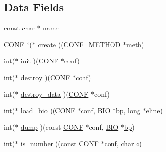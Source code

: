 \subsection*{Data Fields}
\begin{DoxyCompactItemize}
\item 
const char $\ast$ \hyperlink{structconf__method__st_afcd1706c9144e6d6eee6127661ae3be2}{name}
\item 
\hyperlink{crypto_2ossl__typ_8h_a22bfdc2f19c31f1ec7bd6d807aeb68d2}{C\+O\+NF} $\ast$($\ast$ \hyperlink{structconf__method__st_a5b75aba720dbe63825206c993d97607d}{create} )(\hyperlink{crypto_2conf_2conf_8h_a8e1c42b09eb2fde768c3a90e8338a6ea}{C\+O\+N\+F\+\_\+\+M\+E\+T\+H\+OD} $\ast$meth)
\item 
int($\ast$ \hyperlink{structconf__method__st_aa0e0f4791abf370d6be68caba8aa10e5}{init} )(\hyperlink{crypto_2ossl__typ_8h_a22bfdc2f19c31f1ec7bd6d807aeb68d2}{C\+O\+NF} $\ast$conf)
\item 
int($\ast$ \hyperlink{structconf__method__st_ac5ae49e4cf00c4babd1ca0856eae887f}{destroy} )(\hyperlink{crypto_2ossl__typ_8h_a22bfdc2f19c31f1ec7bd6d807aeb68d2}{C\+O\+NF} $\ast$conf)
\item 
int($\ast$ \hyperlink{structconf__method__st_ab26bafbc683c2d302af32da8c302148f}{destroy\+\_\+data} )(\hyperlink{crypto_2ossl__typ_8h_a22bfdc2f19c31f1ec7bd6d807aeb68d2}{C\+O\+NF} $\ast$conf)
\item 
int($\ast$ \hyperlink{structconf__method__st_a81743c52fe3cb06880a39ee2dc93f08e}{load\+\_\+bio} )(\hyperlink{crypto_2ossl__typ_8h_a22bfdc2f19c31f1ec7bd6d807aeb68d2}{C\+O\+NF} $\ast$conf, \hyperlink{crypto_2bio_2bio_8h_af3fabae1c9af50b9312cdff41e11d1dd}{B\+IO} $\ast$\hyperlink{include_2openssl_2conf_8h_a8f12a78fdc053e4143bc0896f8b3d937}{bp}, long $\ast$\hyperlink{include_2openssl_2conf_8h_aff307de415418f7f6d79b819a7fe3f4d}{eline})
\item 
int($\ast$ \hyperlink{structconf__method__st_ad1fb4d6aba428459f0739536eec3e751}{dump} )(const \hyperlink{crypto_2ossl__typ_8h_a22bfdc2f19c31f1ec7bd6d807aeb68d2}{C\+O\+NF} $\ast$conf, \hyperlink{crypto_2bio_2bio_8h_af3fabae1c9af50b9312cdff41e11d1dd}{B\+IO} $\ast$\hyperlink{include_2openssl_2conf_8h_a8f12a78fdc053e4143bc0896f8b3d937}{bp})
\item 
int($\ast$ \hyperlink{structconf__method__st_a2c94c00027306e6fdf21d38430b80cdc}{is\+\_\+number} )(const \hyperlink{crypto_2ossl__typ_8h_a22bfdc2f19c31f1ec7bd6d807aeb68d2}{C\+O\+NF} $\ast$conf, char \hyperlink{ssl__locl_8h_a0f1453a6148b10d986345d1db98a4d6f}{c})
\item 

\end{DoxyCompactItemize}
